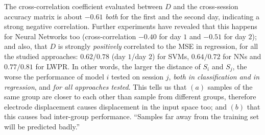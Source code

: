 The cross-correlation coefficient evaluated between $D$ and the
cross-session accuracy matrix is about $-0.61$ \emph{both} for the
first and the second day, indicating a strong negative correlation.
Further experiments have revealed that this happens for Neural
Networks too (cross-correlation $-0.40$ for day $1$ and $-0.51$ for
day $2$); and also, that $D$ is strongly \emph{positively} correlated
to the MSE in regression, for all the studied approaches: $0.62/0.78$
(day $1$/day $2$) for SVMs, $0.64/0.72$ for NNs and $0.77/0.81$ for
LWPR. In other words, the larger the distance of $S_i$ and $S_j$, the
worse the performance of model $i$ tested on session $j$, \emph{both
in classification and in regression}, and \emph{for all approaches
tested}. This tells us that $(a)$ samples of the same group are closer
to each other than sample from different groups, therefore electrode
displacement causes displacement in the input space too; and $(b)$
that this causes bad inter-group performance. ``Samples far away from
the training set will be predicted badly.''





